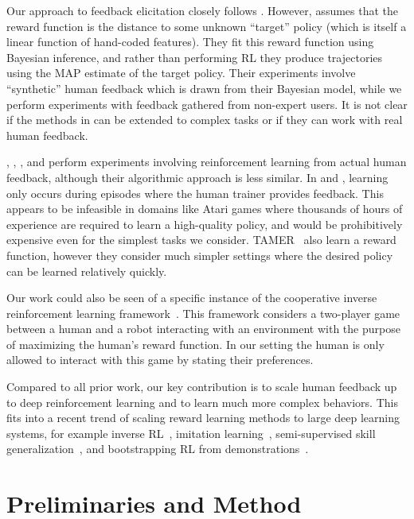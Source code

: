 Our approach to feedback elicitation closely follows \citet{Wilson12}.
However, \citet{Wilson12} assumes that the reward function is the distance to some unknown ``target'' policy (which is itself a linear function of hand-coded features). They fit this reward function using Bayesian inference, and rather than performing RL they produce trajectories using the MAP estimate of the target policy. Their experiments involve ``synthetic'' human feedback which is drawn from their Bayesian model, while we perform experiments with feedback gathered from non-expert users. It is not clear if the methods in \citet{Wilson12} can be extended to complex tasks or if they can work with real human feedback.

\citet{MacGlashan17}, \citet{Pilarski11}, \citet{Knox09}, and \citet{Knox12}
perform experiments involving reinforcement learning from actual human feedback, although their algorithmic approach is less similar. In \citet{MacGlashan17} and \citet{Pilarski11}, learning only occurs during episodes where the human trainer provides feedback. This appears to be infeasible in domains like Atari games where thousands of hours of experience are required to learn a high-quality policy, and would be prohibitively expensive even for the simplest tasks we consider. 
TAMER~\citep{Knox12, Knox13} also learn a reward function, however they consider much simpler settings where the desired policy can be learned relatively quickly.

Our work could also be seen of a specific instance of the cooperative inverse reinforcement learning framework~\citep{CIRL}. This framework considers a two-player game between a human and a robot interacting with an environment with the purpose of maximizing the human's reward function. In our setting the human is only allowed to interact with this game by stating their preferences.

Compared to all prior work, our key contribution is to scale human feedback up to deep reinforcement learning and to learn much more complex behaviors. This fits into a recent trend of scaling reward learning methods to large deep learning systems, for example inverse RL~\citep{Finn16}, imitation learning~\citep{Ho16,Stadie17}, semi-supervised skill generalization~\citep{Finn17}, and bootstrapping RL from demonstrations~\citep{Silver16,Hester17}.

\section{Preliminaries and Method}

